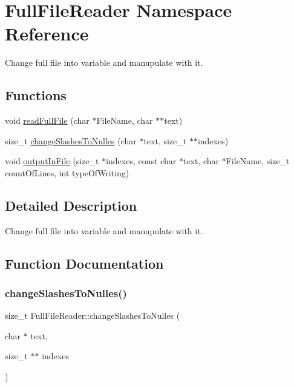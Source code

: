 \hypertarget{namespaceFullFileReader}{}\section{Full\+File\+Reader Namespace Reference}
\label{namespaceFullFileReader}


Change full file into variable and manupulate with it.  


\subsection*{Functions}
\begin{DoxyCompactItemize}
\item 
void \hyperlink{namespaceFullFileReader_af67fbec2a4664b05e1252f99ee75d780}{read\+Full\+File} (char $\ast$File\+Name, char $\ast$$\ast$text)
\item 
size\+\_\+t \hyperlink{namespaceFullFileReader_afefb39a3a7630f4961134c7fcf9ee629}{change\+Slashes\+To\+Nulles} (char $\ast$text, size\+\_\+t $\ast$$\ast$indexes)
\item 
void \hyperlink{namespaceFullFileReader_a2637b7673675980863dcca5d268c330a}{output\+In\+File} (size\+\_\+t $\ast$indexes, const char $\ast$text, char $\ast$File\+Name, size\+\_\+t count\+Of\+Lines, int type\+Of\+Writing)
\end{DoxyCompactItemize}


\subsection{Detailed Description}
Change full file into variable and manupulate with it. 

\subsection{Function Documentation}
\mbox{\label{namespaceFullFileReader_afefb39a3a7630f4961134c7fcf9ee629}} 
\subsubsection{\texorpdfstring{change\+Slashes\+To\+Nulles()}{changeSlashesToNulles()}}
{\footnotesize\ttfamily size\+\_\+t Full\+File\+Reader\+::change\+Slashes\+To\+Nulles (\begin{DoxyParamCaption}\item[{char $\ast$}]{text,  }\item[{size\+\_\+t $\ast$$\ast$}]{indexes }\end{DoxyParamCaption})}

